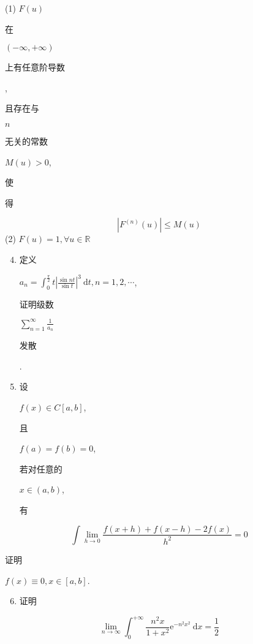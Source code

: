 \documentclass[10pt]{article}
\begin{document}
(1) $F(u)$ \begin{CJK}{UTF8}{mj}在\end{CJK} $(-\infty,+\infty)$ \begin{CJK}{UTF8}{mj}上有任意阶导数\end{CJK}, \begin{CJK}{UTF8}{mj}且存在与\end{CJK} $n$ \begin{CJK}{UTF8}{mj}无关的常数\end{CJK} $M(u)>0$, \begin{CJK}{UTF8}{mj}使\end{CJK} \begin{CJK}{UTF8}{mj}得\end{CJK}
$$
\left|F^{(n)}(u)\right| \leq M(u)
$$
(2) $F(u)=1, \forall u \in \mathbb{R}$

\begin{enumerate}
  \setcounter{enumi}{3}
  \item \begin{CJK}{UTF8}{mj}定义\end{CJK} $a_{n}=\int_{0}^{\frac{\pi}{2}} t\left|\frac{\sin n t}{\sin t}\right|^{3} \mathrm{~d} t, n=1,2, \cdots$, \begin{CJK}{UTF8}{mj}证明级数\end{CJK} $\sum_{n=1}^{\infty} \frac{1}{a_{n}}$ \begin{CJK}{UTF8}{mj}发散\end{CJK}.

  \item \begin{CJK}{UTF8}{mj}设\end{CJK} $f(x) \in C[a, b]$, \begin{CJK}{UTF8}{mj}且\end{CJK} $f(a)=f(b)=0$, \begin{CJK}{UTF8}{mj}若对任意的\end{CJK} $x \in(a, b)$, \begin{CJK}{UTF8}{mj}有\end{CJK}

\end{enumerate}
$$
\int \lim _{h \rightarrow 0} \frac{f(x+h)+f(x-h)-2 f(x)}{h^{2}}=0
$$
\begin{CJK}{UTF8}{mj}证明\end{CJK} $f(x) \equiv 0, x \in[a, b]$.

\begin{enumerate}
  \setcounter{enumi}{5}
  \item \begin{CJK}{UTF8}{mj}证明\end{CJK}
\end{enumerate}
$$
\lim _{n \rightarrow \infty} \int_{0}^{+\infty} \frac{n^{2} x}{1+x^{2}} \mathrm{e}^{-n^{2} x^{2}} \mathrm{~d} x=\frac{1}{2}
$$
\end{document}
